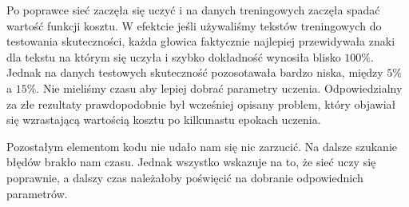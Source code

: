 Po poprawce sieć zaczęła się uczyć i na danych treningowych zaczęła spadać wartość funkcji kosztu. W efektcie jeśli
używaliśmy tekstów treningowych do testowania skuteczności, każda głowica faktycznie najlepiej przewidywała
znaki dla tekstu na którym się uczyła i szybko dokładność wynosiła blisko $100\%$. Jednak na danych testowych
skuteczność pozosotawała bardzo niska, między $5\%$ a $15\%$. Nie mieliśmy czasu aby lepiej dobrać parametry uczenia.
Odpowiedzialny za złe rezultaty prawdopodobnie był wcześniej opisany problem, który objawiał 
się wzrastającą wartością kosztu po kilkunastu epokach uczenia.

Pozostałym elementom kodu nie udało nam się nic zarzucić. Na dalsze szukanie błędów brakło nam czasu.
Jednak wszystko wskazuje na to, że sieć uczy się poprawnie, a dalszy czas należałoby poświęcić na dobranie odpowiednich
parametrów.
